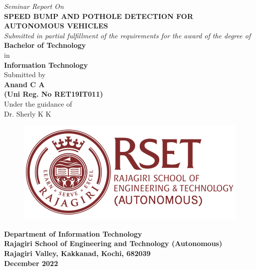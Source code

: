 \thispagestyle{empty}
\graphicspath{{Figures/}}
\begin{center}

    \singlespacing
    \textit{\large Seminar Report On }
    \\
    \huge \textbf{SPEED BUMP AND POTHOLE DETECTION FOR AUTONOMOUS VEHICLES}
    \vspace{10mm}
    \\
    \large \textit{Submitted in partial fulfillment of the requirements for the award of the degree of} \\
    \Large\textbf{Bachelor of Technology } 
    \\in\\
    \textbf{Information Technology} 
    \vspace{10mm}
    \\ \large Submitted by \\
    \textbf{Anand C A \\
   (Uni Reg. No RET19IT011) }\\
   \vspace{8mm}
    Under the guidance of \\
    Dr. Sherly K K\\
    \vspace{8mm}
    \begin{figure}[h]
        \centering
        \includegraphics[scale=0.5]{rset_logo.png}
        \label{rset_logo}
    \end{figure}
    \vspace{10mm}
    \textbf{Department of Information Technology\\ 
Rajagiri School of Engineering and Technology (Autonomous)\\
Rajagiri Valley, Kakkanad, Kochi, 682039 \\
December 2022 
}

\end{center}   
\thispagestyle{empty}